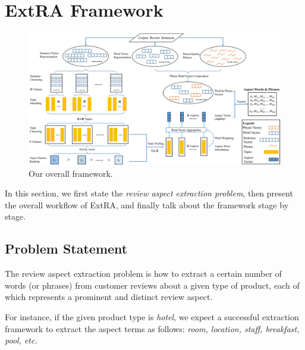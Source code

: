 \section{ExtRA Framework}
\label{sec:method}

\begin{figure}[th]
	\centering
	\includegraphics[width=\textwidth]{figures/overview}
	\caption{Our overall framework.}
	\label{fig:framework}
\end{figure}
In this section, we first state the \textit{review aspect extraction problem}, then present the overall workflow of ExtRA, and finally talk about the framework stage by stage. 
\subsection{Problem Statement}
The review aspect extraction problem is how to extract a certain number of words (or phrases) 
from customer reviews about a given type of product,
each of which represents a prominent and distinct review aspect. 

For instance, if the given product type is \textit{hotel}, we expect a successful extraction framework to extract the aspect terms as follows: 
\textit{room, location, staff, breakfast, pool, etc.}
